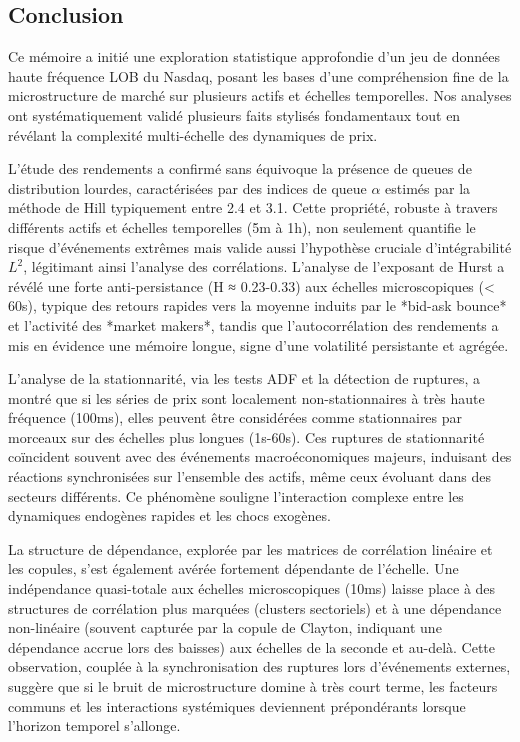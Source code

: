 \documentclass[10pt,a4paper]{article}
\theoremstyle{definition}
\theoremstyle{remark}
\begin{document}
\begin{itemize}
\newpage
\section*{Conclusion}

    Ce mémoire a initié une exploration statistique approfondie d'un jeu de données haute fréquence LOB du Nasdaq, posant les bases d'une compréhension fine de la microstructure de marché sur plusieurs actifs et échelles temporelles. Nos analyses ont systématiquement validé plusieurs faits stylisés fondamentaux tout en révélant la complexité multi-échelle des dynamiques de prix.

    L'étude des rendements a confirmé sans équivoque la présence de queues de distribution lourdes, caractérisées par des indices de queue $\alpha$ estimés par la méthode de Hill typiquement entre 2.4 et 3.1. Cette propriété, robuste à travers différents actifs et échelles temporelles (5m à 1h), non seulement quantifie le risque d'événements extrêmes mais valide aussi l'hypothèse cruciale d'intégrabilité $L^2$, légitimant ainsi l'analyse des corrélations. L'analyse de l'exposant de Hurst a révélé une forte anti-persistance (H ≈ 0.23-0.33) aux échelles microscopiques (< 60s), typique des retours rapides vers la moyenne induits par le *bid-ask bounce* et l'activité des *market makers*, tandis que l'autocorrélation des rendements a mis en évidence une mémoire longue, signe d'une volatilité persistante et agrégée.

    L'analyse de la stationnarité, via les tests ADF et la détection de ruptures, a montré que si les séries de prix sont localement non-stationnaires à très haute fréquence (100ms), elles peuvent être considérées comme stationnaires par morceaux sur des échelles plus longues (1s-60s). Ces ruptures de stationnarité coïncident souvent avec des événements macroéconomiques majeurs, induisant des réactions synchronisées sur l'ensemble des actifs, même ceux évoluant dans des secteurs différents. Ce phénomène souligne l'interaction complexe entre les dynamiques endogènes rapides et les chocs exogènes.

    La structure de dépendance, explorée par les matrices de corrélation linéaire et les copules, s'est également avérée fortement dépendante de l'échelle. Une indépendance quasi-totale aux échelles microscopiques (10ms) laisse place à des structures de corrélation plus marquées (clusters sectoriels) et à une dépendance non-linéaire (souvent capturée par la copule de Clayton, indiquant une dépendance accrue lors des baisses) aux échelles de la seconde et au-delà. Cette observation, couplée à la synchronisation des ruptures lors d'événements externes, suggère que si le bruit de microstructure domine à très court terme, les facteurs communs et les interactions systémiques deviennent prépondérants lorsque l'horizon temporel s'allonge.


\end{itemize}
\end{document}
